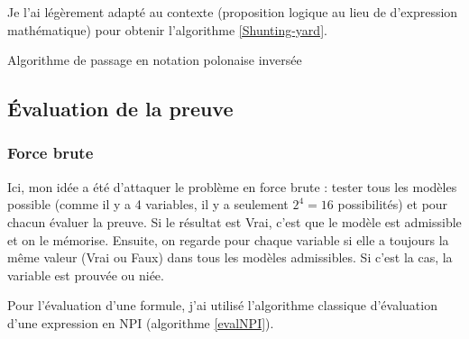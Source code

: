 \documentclass[12pt, algo]{cours}
\begin{document}
Je l'ai légèrement adapté au contexte (proposition logique au lieu de d'expression mathématique) pour obtenir l'algorithme \ref{Shunting-yard}.


\begin{algorithm}[h]
\caption{Algorithme de passage en notation polonaise inversée}
\label{Shunting-yard}
\end{algorithm}

\subsection{Évaluation de la preuve}

\subsubsection{Force brute}

Ici, mon idée a été d'attaquer le problème en force brute : tester tous les modèles possible (comme il y a 4 variables, il y a seulement $2^4=16$ possibilités) et pour chacun évaluer la preuve. Si le résultat est Vrai, c'est que le modèle est admissible et on le mémorise. Ensuite, on regarde pour chaque variable si elle a toujours la même valeur (Vrai ou Faux) dans tous les modèles admissibles. Si c'est la cas, la variable est prouvée ou niée.

Pour l'évaluation d'une formule, j'ai utilisé l'algorithme classique d'évaluation d'une expression en NPI (algorithme \ref{evalNPI}).
\end{document}
